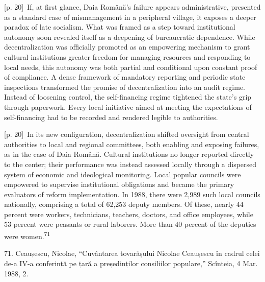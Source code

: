 \documentclass[10pt,a4paper]{article}
\begin{document}
{\scriptsize\color{gray} [p. 20]}\ If, at first glance, Daia Română’s failure appears administrative, presented as a standard case of mismanagement in a peripheral village, it exposes a deeper paradox of late socialism. What was framed as a step toward institutional autonomy soon revealed itself as a deepening of bureaucratic dependence. While decentralization was officially promoted as an empowering mechanism to grant cultural institutions greater freedom for managing resources and responding to local needs, this autonomy was both partial and conditional upon constant proof of compliance. A dense framework of mandatory reporting and periodic state inspections transformed the promise of decentralization into an audit regime. Instead of loosening control, the self-financing regime tightened the state’s grip through paperwork. Every local initiative aimed at meeting the expectations of self-financing had to be recorded and rendered legible to authorities.\par
{\scriptsize\color{gray} [p. 20]}\ In its new configuration, decentralization shifted oversight from central authorities to local and regional committees, both enabling and exposing failures, as in the case of Daia Română. Cultural institutions no longer reported directly to the center; their performance was instead assessed locally through a dispersed system of economic and ideological monitoring. Local popular councils were empowered to supervise institutional obligations and became the primary evaluators of reform implementation. In 1988, there were 2,989 such local councils nationally, comprising a total of 62,253 deputy members. Of these, nearly 44 percent were workers, technicians, teachers, doctors, and office employees, while 53 percent were peasants or rural laborers. More than 40 percent of the deputies were women.\nobreak\textsuperscript{71}\par{\small 71. Ceaușescu, Nicolae, “Cuvântarea tovarășului Nicolae Ceaușescu în cadrul celei de-a IV-a conferință pe țară a președinților consiliilor populare,” Scînteia, 4 Mar. 1988, 2.\par}
\end{document}
